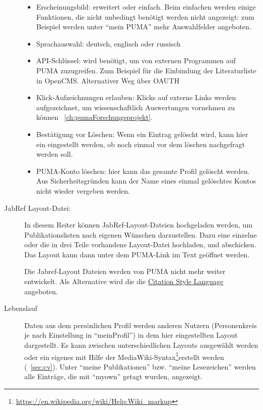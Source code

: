 \begin{description}
\begin{itemize}
      \item Erscheinungsbild: erweitert oder einfach. Beim einfachen werden einige Funktionen, die nicht unbedingt benötigt werden nicht angezeigt: zum Beispiel werden unter \enquote{mein PUMA} mehr Auswahlfelder angeboten.
      \item Sprachauswahl: deutsch, englisch oder russisch
      \item API-Schlüssel: wird benötigt, um von externen Programmen auf PUMA zuzugreifen. Zum Beispiel für die Einbindung der Literaturliste in OpenCMS. Alternativer Weg über OAUTH 
      \item Klick-Aufzeichnungen erlauben: Klicks auf externe Links werden aufgezeichnet, um wissenschaftlich Auswertungen vornehmen zu können ~\autoref{ch:pumaForschungsprojekt}.
      \item Bestätigung vor Löschen: Wenn ein Eintrag gelöscht wird, kann hier ein eingestellt werden, ob noch einmal vor dem löschen nachgefragt werden soll.
      \item PUMA-Konto löschen: hier kann das gesamte Profil gelöscht werden. Aus Sicherheitsgründen kann der Name eines einmal gelöschtes Kontos nicht wieder vergeben werden.
			\end{itemize}
   \item[JabRef Layout-Datei:] 
	In diesem Reiter können JabRef-Layout-Dateien hochgeladen werden, um Publikationslisten nach eigenen Wünschen darzustellen. Dazu eine einzelne oder die in drei Teile vorhandene Layout-Datei hochladen, und abschicken. Das Layout kann dann unter dem PUMA-Link im Text geöffnet werden. %
\begin{tip} Die Jabref-Layout Dateien werden von PUMA nicht mehr weiter entwickelt. Als Alternative wird die die \href{http://citationstyles.org/}{Citation Style Language} angeboten.
\end{tip}
\item[Lebenslauf\index{Lebenslauf}]
Daten aus dem persönlichen Profil werden anderen Nutzern (Personenkreis je nach Einstellung in \enquote{meinProfil}) in dem hier eingestellten Layout dargestellt. Es kann zwischen unterschiedlichen Layouts ausgewählt werden oder ein eigenes mit Hilfe der MediaWiki-Syntax\footnote{\url{https://en.wikipedia.org/wiki/Help:Wiki_markup}}erstellt werden (~\autoref{sec:cv}). Unter \enquote{meine Publikationen} bzw. \enquote{meine Lesezeichen} werden alle Einträge, die mit \enquote{myown} getagt wurden, angezeigt.

\end{description}

